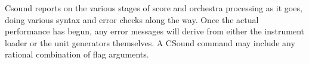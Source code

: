   Csound reports on the various stages of score and orchestra processing as it goes, doing various syntax and error checks along the way. Once the actual performance has begun, any error messages will derive from either the instrument loader or the unit generators themselves. A CSound command may include any rational combination of flag arguments. 


\begin{comment}
\begin{tabular}{lcr}
Previous &Home &Next \\
The Csound Command &Up &Command-line Flags

\end{tabular}



\end{comment}
